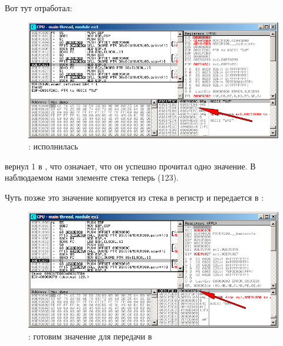 \clearpage
Вот тут \scanf отработал:

\begin{figure}[H]
\centering
\includegraphics[scale=\FigScale]{patterns/04_scanf/1_simple/ex1_olly_3.png}
\caption{\olly: \scanf исполнилась}
\label{fig:scanf_ex1_olly_3}
\end{figure}

\scanf вернул 1 в \EAX, что означает, что он успешно прочитал одно значение.
В наблюдаемом нами элементе стека теперь  (123).

\clearpage
Чуть позже это значение копируется из стека в регистр \ECX и передается в \printf{}:

\begin{figure}[H]
\centering
\includegraphics[scale=\FigScale]{patterns/04_scanf/1_simple/ex1_olly_4.png}
\caption{\olly: готовим значение для передачи в \printf}
\label{fig:scanf_ex1_olly_4}
\end{figure}
